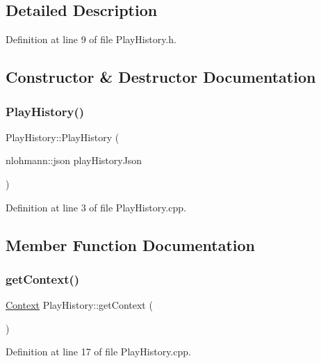 \subsection{Detailed Description}


Definition at line 9 of file Play\+History.\+h.



\subsection{Constructor \& Destructor Documentation}
\mbox{\label{class_play_history_a6c737045b91392aacc82f3a217cce4d7}} 
\subsubsection{\texorpdfstring{Play\+History()}{PlayHistory()}}
{\footnotesize\ttfamily Play\+History\+::\+Play\+History (\begin{DoxyParamCaption}\item[{nlohmann\+::json}]{play\+History\+Json }\end{DoxyParamCaption})}



Definition at line 3 of file Play\+History.\+cpp.



\subsection{Member Function Documentation}
\mbox{\label{class_play_history_ac110c181cf56e2d3f5b6e5041f557371}} 
\subsubsection{\texorpdfstring{get\+Context()}{getContext()}}
{\footnotesize\ttfamily \mbox{\hyperlink{class_context}{Context}} Play\+History\+::get\+Context (\begin{DoxyParamCaption}{ }\end{DoxyParamCaption})}



Definition at line 17 of file Play\+History.\+cpp.

